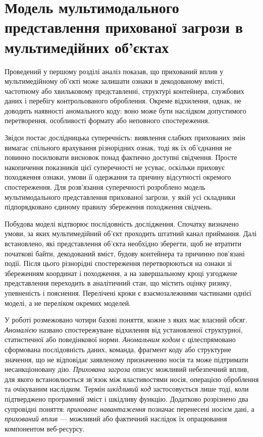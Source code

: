 \chapter{Модель мультимодального представлення прихованої загрози в мультимедійних об’єктах}
\label{chap:models_formalization}

Проведений у першому розділі аналіз показав, що прихований вплив у мультимедійному об’єкті може залишати ознаки в декодованому вмісті, частотному або хвильковому представленні, структурі контейнера, службових даних і перебігу контрольованого оброблення. Окреме відхилення, однак, не доводить наявності аномального коду: воно може бути наслідком допустимого перетворення, особливості формату або неповного спостереження.

Звідси постає дослідницька суперечність: виявлення слабких прихованих змін вимагає спільного врахування різнорідних ознак, тоді як їх об’єднання не повинно посилювати висновок понад фактично доступні свідчення. Просте накопичення показників цієї суперечності не усуває, оскільки приховує походження ознаки, умови її одержання та причину відсутності окремого спостереження. Для розв’язання суперечності розроблено модель мультимодального представлення прихованої загрози, у якій усі складники підпорядковано єдиному правилу збереження походження свідчень.

Побудова моделі відтворює послідовність дослідження. Спочатку визначено умови, за яких мультимедійний об’єкт проходить штатний канал приймання. Далі встановлено, які представлення об’єкта необхідно зберегти, щоб не втратити початкові байти, декодований вміст, будову контейнера та причинно пов’язані події. Після цього різнорідні спостереження перетворюються на ознаки зі збереженням координат і походження, а на завершальному кроці узгоджене представлення переходить в аналітичний стан, що містить оцінку ризику, упевненість і пояснення. Перелічені кроки є взаємозалежними частинами однієї моделі, а не переліком окремих моделей.

У роботі розмежовано чотири базові поняття, кожне з яких має власний обсяг. \textit{Аномалією} названо спостережуване відхилення від установленої структурної, статистичної або поведінкової норми. \textit{Аномальним кодом} є цілеспрямовано сформована послідовність даних, команда, фрагмент коду або структурне значення, що не відповідає заявленому призначенню носія та може підтримати несанкціоновану дію. \textit{Прихована загроза} описує можливий небезпечний вплив, для якого встановлюється зв’язок між властивостями носія, операцією оброблення та очікуваним наслідком. Термін \textit{шкідливий код} застосовується лише тоді, коли підтверджено програмний зміст і шкідливу функцію. Додатково розрізнено два супровідні поняття: \textit{приховане навантаження} позначає перенесені носієм дані, а \textit{прихований вплив} --- можливий або фактичний наслідок їх опрацювання компонентом веб-ресурсу.

